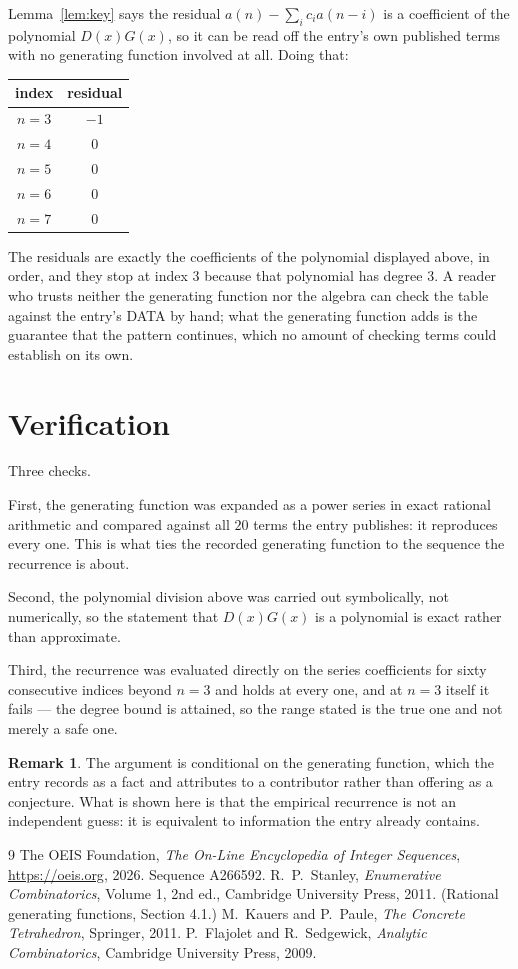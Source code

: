 \documentclass[11pt,a4paper]{article}
\theoremstyle{plain}
\theoremstyle{definition}
\newtheorem{remark}[theorem]{Remark}
\begin{document}
Lemma~\ref{lem:key} says the residual $a(n)-\sum_ic_ia(n-i)$ is a coefficient of the
polynomial $D(x)G(x)$, so it can be read off the entry's own published terms with no
generating function involved at all. Doing that:
\begin{center}
\begin{tabular}{cc}
index & residual \\ \hline
$n=3$ & $-1$ \\
$n=4$ & $0$ \\
$n=5$ & $0$ \\
$n=6$ & $0$ \\
$n=7$ & $0$
\end{tabular}
\end{center}
The residuals are exactly the coefficients of the polynomial displayed above, in order, and
they stop at index $3$ because that polynomial has degree $3$. A reader who trusts
neither the generating function nor the algebra can check the table against the entry's DATA
by hand; what the generating function adds is the guarantee that the pattern continues, which
no amount of checking terms could establish on its own.

\section{Verification}

Three checks.

First, the generating function was expanded as a power series in exact rational arithmetic and
compared against all $20$ terms the entry publishes: it reproduces every one. This is
what ties the recorded generating function to the sequence the recurrence is about.

Second, the polynomial division above was carried out symbolically, not numerically, so the
statement that $D(x)G(x)$ is a polynomial is exact rather than approximate.

Third, the recurrence was evaluated directly on the series coefficients for sixty consecutive
indices beyond $n=3$ and holds at every one, and at $n=3$ itself it fails --- the
degree bound is attained, so the range stated is the true one and not merely a safe one.

\begin{remark}
The argument is conditional on the generating function, which the entry records as a fact and
attributes to a contributor rather than offering as a conjecture. What is shown here is that
the empirical recurrence is not an independent guess: it is equivalent to information the
entry already contains.
\end{remark}

\begin{thebibliography}{9}
 The OEIS Foundation, \emph{The On-Line Encyclopedia of Integer
Sequences}, \url{https://oeis.org}, 2026. Sequence A266592.
 R.~P.~Stanley, \emph{Enumerative Combinatorics}, Volume 1, 2nd ed.,
Cambridge University Press, 2011. (Rational generating functions, Section 4.1.)
 M.~Kauers and P.~Paule, \emph{The Concrete Tetrahedron}, Springer, 2011.
 P.~Flajolet and R.~Sedgewick, \emph{Analytic Combinatorics}, Cambridge
University Press, 2009.
\end{thebibliography}
\end{document}
